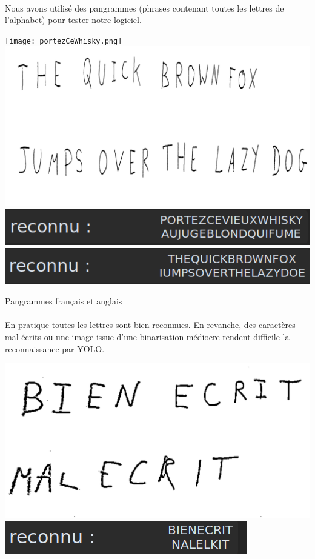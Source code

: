 \documentclass[a4paper]{article}
\begin{document}
			\paragraph{} Nous avons utilisé des pangrammes (phrases contenant toutes les lettres de l'alphabet) pour tester notre logiciel.
			
			\begin{center}
				\texttt{[image: portezCeWhisky.png]}
				\includegraphics[width=.45\textwidth]{theBrownFox.png}
				\includegraphics[width=.45\textwidth]{portezCeWhiskyLabel.png}
				\includegraphics[width=.45\textwidth]{theBrownFoxLabel.png}
				\caption{ Pangrammes français et anglais}
			\end{center}
			\newline
			\newline
			\paragraph{} En pratique toutes les lettres sont bien reconnues. En revanche, des caractères mal écrits ou une image issue d'une binarisation médiocre rendent difficile la reconnaissance par YOLO.
			

			\begin{center}
				\includegraphics[width=.4\textwidth]{bienEcritMalEcrit.png}
				\includegraphics[width=.4\textwidth]{bienEcritMalEcritLabel.png}
			\end{center}
\end{document}
